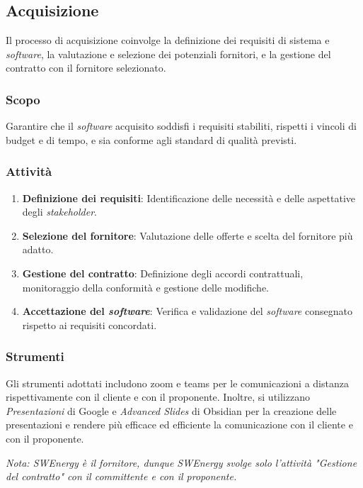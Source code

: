 \subsection{Acquisizione}

Il processo di acquisizione coinvolge la definizione dei requisiti di sistema e
\textit{software}, la valutazione e selezione dei potenziali fornitori, e la gestione del
contratto con il fornitore selezionato.

\subsubsection{Scopo}
Garantire che il \textit{software} acquisito soddisfi i requisiti stabiliti, rispetti i
vincoli di budget e di tempo, e sia conforme agli standard di qualità previsti.

\subsubsection{Attività}
\begin{enumerate}
	\item \textbf{Definizione dei requisiti}: Identificazione delle necessità e
	      delle aspettative degli \textit{stakeholder}.
	\item \textbf{Selezione del fornitore}: Valutazione delle offerte e scelta
	      del fornitore più adatto.
	\item \textbf{Gestione del contratto}: Definizione degli accordi
	      contrattuali, monitoraggio della conformità e gestione delle
	      modifiche.
	\item \textbf{Accettazione del \textit{software}}: Verifica e validazione del
	      \textit{software} consegnato rispetto ai requisiti concordati.
\end{enumerate}

\subsubsection{Strumenti}
Gli strumenti adottati includono zoom e teams per le comunicazioni a distanza
rispettivamente con il cliente e con il proponente. Inoltre, si utilizzano
\textit{Presentazioni} di Google e \textit{Advanced Slides} di Obsidian per la
creazione delle presentazioni e rendere più efficace ed efficiente la
comunicazione con il cliente e con il proponente.

\textit{Nota: SWEnergy è il fornitore, dunque SWEnergy svolge solo l'attività
	"Gestione del contratto" con il committente e con il proponente.}
